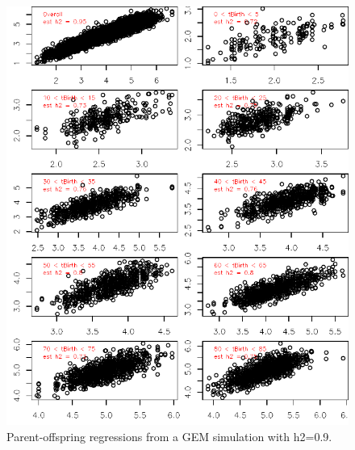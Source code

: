 \documentclass[12pt,reqno,final,pdftex]{amsart}\usepackage[]{graphicx}\usepackage[]{color}
\newenvironment{knitrout}{}{} %
\theoremstyle{plain}
\numberwithin{equation}{part}
\begin{document}
\begin{knitrout}\scriptsize
{}\color{fgcolor}\begin{figure}

\includegraphics[width=\linewidth]{figure/unnamed-chunk-5-1} \hfill{}

\caption[Parent-offspring regressions from a GEM simulation with h2=0.9]{Parent-offspring regressions from a GEM simulation with h2=0.9.}\label{fig:unnamed-chunk-5}
\end{figure}


\end{knitrout}
\end{document}
